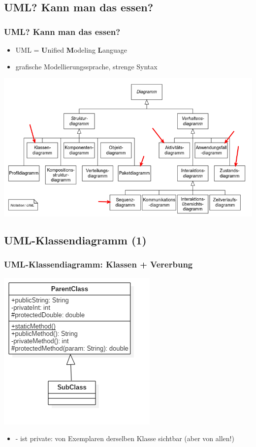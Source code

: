 \documentclass[18pt]{beamer}
\begin{document}
	\subsection{UML? Kann man das essen?}
	\begin{frame}
		\frametitle{UML? Kann man das essen?}
		\begin{itemize}
			\item UML = \textbf{U}nified \textbf{M}odeling \textbf{L}anguage
			\item grafische Modellierungssprache, strenge Syntax
		\end{itemize}
		\includegraphics[scale=0.35]{./pics/tut1/uml_diagrams.png}
	\end{frame}	
	
	\subsection{UML-Klassendiagramm (1)}
	\begin{frame}
		\frametitle{UML-Klassendiagramm: Klassen + Vererbung}
		\includegraphics[scale=0.5]{./pics/tut1/inheritence.png}
		\begin{small}
			\begin{itemize}
				\item - ist private: von Exemplaren derselben Klasse sichtbar (aber von allen!)
			\end{itemize}
		\end{small}
	\end{frame}
	
\end{document}
